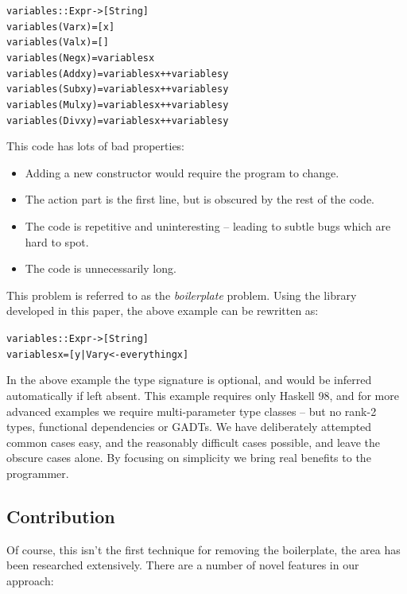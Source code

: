 \documentclass[preprint]{sigplanconf}
\newenvironment{code}{\begin{alltt}\small}{\end{alltt}}
\begin{document}
\begin{code}
variables :: Expr -> [String]
variables (Var  x    ) = [x]
variables (Val  x    ) = []
variables (Neg  x    ) = variables x
variables (Add  x y  ) = variables x ++ variables y
variables (Sub  x y  ) = variables x ++ variables y
variables (Mul  x y  ) = variables x ++ variables y
variables (Div  x y  ) = variables x ++ variables y
\end{code}

This code has lots of bad properties:

\begin{itemize}
\item Adding a new constructor would require the program to change.
\item The action part is the first line, but is obscured by the rest of the code.
\item The code is repetitive and uninteresting -- leading to subtle bugs which are hard to spot.
\item The code is unnecessarily long.
\end{itemize}

This problem is referred to as the \textit{boilerplate} problem. Using the library developed in this paper, the above example can be rewritten as:

\begin{code}
variables :: Expr -> [String]
variables x = [y | Var y <- everything x]
\end{code}

In the above example the type signature is optional, and would be inferred automatically if left absent. This example requires only Haskell 98, and for more advanced examples we require multi-parameter type classes -- but no rank-2 types, functional dependencies or GADTs. We have deliberately attempted common cases easy, and the reasonably difficult cases possible, and leave the obscure cases alone. By focusing on simplicity we bring real benefits to the programmer.

\subsection{Contribution}

Of course, this isn't the first technique for removing the boilerplate, the area has been researched extensively. There are a number of novel features in our approach:
\end{document}
